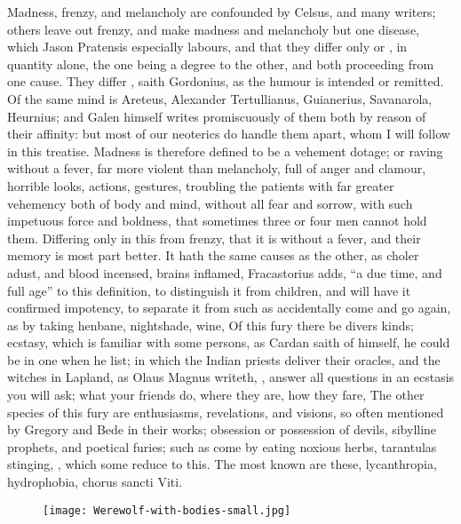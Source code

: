 Madness, frenzy, and melancholy are confounded by Celsus, and many writers;
others leave out frenzy, and make madness and melancholy but one disease, which
Jason Pratensis especially labours, and that they differ
only  or , in quantity alone, the one being a
degree to the other, and both proceeding from one cause. They differ
, saith Gordonius, as the
humour is intended or remitted. Of the same mind is
Areteus, Alexander Tertullianus, Guianerius, Savanarola,
Heurnius; and Galen himself writes promiscuously of them both by reason of
their affinity: but most of our neoterics do handle them apart, whom I will
follow in this treatise. Madness is therefore defined to be a vehement dotage;
or raving without a fever, far more violent than melancholy, full of anger and
clamour, horrible looks, actions, gestures, troubling the patients with far
greater vehemency both of body and mind, without all fear and sorrow, with such
impetuous force and boldness, that sometimes three or four men cannot hold
them. Differing only in this from frenzy, that it is without a fever, and their
memory is most part better. It hath the same causes as the other, as choler
adust, and blood incensed, brains inflamed, \etc{}
Fracastorius adds, \enquote{a due time, and full age} to this
definition, to distinguish it from children, and will have it confirmed
impotency, to separate it from such as accidentally come and go again, as by
taking henbane, nightshade, wine, \etc{} Of this fury there be divers kinds;
ecstasy, which is familiar with some persons, as Cardan
saith of himself, he could be in one when he list; in which the Indian priests
deliver their oracles, and the witches in Lapland, as Olaus Magnus writeth,
 , answer all
questions in an ecstasis you will ask; what your friends do, where they are,
how they fare, \etc{} The other species of this fury are enthusiasms,
revelations, and visions, so often mentioned by Gregory and Bede in their
works; obsession or possession of devils, sibylline prophets, and poetical
furies; such as come by eating noxious herbs, tarantulas stinging, \etc{},
which some reduce to this. The most known are these, lycanthropia, hydrophobia,
chorus sancti Viti.

\cleartoleftpage{}
\begin{figure}[p]
  \begingroup
  \centering
  \texttt{[image: Werewolf-with-bodies-small.jpg]}
  \label{fig:werewolf}
\end{figure}

